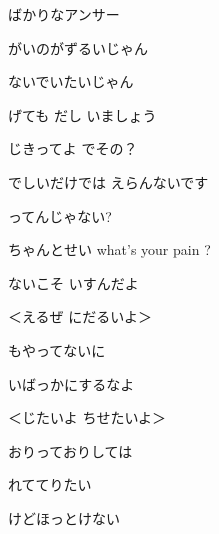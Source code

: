 \documentclass[a4paper,tate,twocolumn,12pt]{ltjtarticle}
\begin{document}
\begin{flushleft}
\begin{minipage}{\linewidth}
ばかりなアンサー

がいのがずるいじゃん

ないでいたいじゃん

げても だし いましょう
\end{minipage}

\vspace{2em}

\noindent\begin{minipage}{\linewidth}
じきってよ でその？

でしいだけでは えらんないです

ってんじゃない?

ちゃんとせい what's your pain ?

ないこそ いすんだよ
\end{minipage}

\vspace{2em}

\noindent\begin{minipage}{\linewidth}
＜えるぜ にだるいよ＞

もやってないに

いばっかにするなよ

＜じたいよ ちせたいよ＞

おりっておりしては

れててりたい

けどほっとけない 
\end{minipage}

\end{flushleft}
\end{document}
